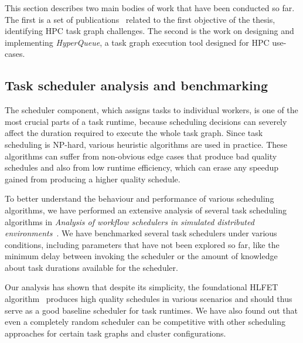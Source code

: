 This section describes two main bodies of work that have been conducted so far. The first is a
set of publications~\cite{estee,rsds,spin2,spin} related to the first objective of the thesis,
identifying HPC task graph challenges. The second is the work on designing and implementing
\emph{HyperQueue}, a task graph execution tool designed for HPC use-cases.

\subsection{Task scheduler analysis and benchmarking}
The scheduler component, which assigns tasks to individual workers, is one of the
most crucial parts of a task runtime, because scheduling decisions can severely affect the
duration required to execute the whole task graph. Since task scheduling is NP-hard, various
heuristic algorithms are used in practice. These algorithms can suffer from non-obvious edge cases
that produce bad quality schedules and also from low runtime efficiency, which can erase any
speedup gained from producing a higher quality schedule.

To better understand the behaviour and performance of various scheduling algorithms, we have
performed an extensive analysis of several task scheduling algorithms in
\emph{Analysis of workflow schedulers in simulated distributed environments}~\cite{estee}.
We have benchmarked several task schedulers under various conditions, including parameters that
have not been explored so far, like the minimum delay between invoking the
scheduler or the amount of knowledge about task durations available for the scheduler.

Our analysis has shown that despite its simplicity, the foundational HLFET
algorithm~\cite{hlfet1974} produces high quality schedules in various scenarios and should thus
serve as a good baseline scheduler for task runtimes. We have also found out that even a
completely random scheduler can be competitive with other scheduling approaches for certain task
graphs and cluster configurations.



